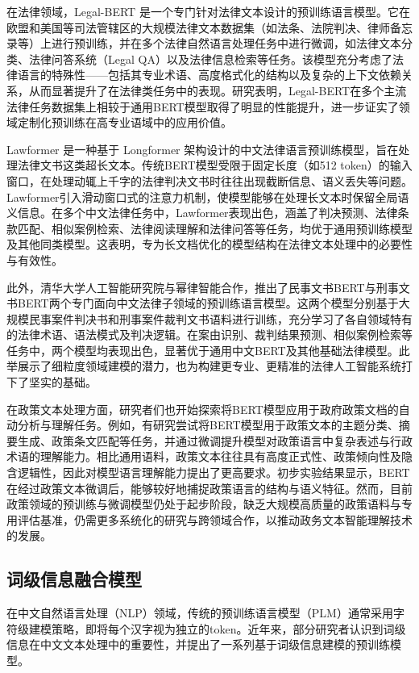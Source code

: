 \documentclass[12pt, a4paper]{ctexart}
\begin{document}
在法律领域，Legal-BERT 是一个专门针对法律文本设计的预训练语言模型\cite{chalkidis2020legalbertmuppetsstraightlaw}。它在欧盟和美国等司法管辖区的大规模法律文本数据集（如法条、法院判决、律师备忘录等）上进行预训练，并在多个法律自然语言处理任务中进行微调，如法律文本分类、法律问答系统（Legal QA）以及法律信息检索等任务。该模型充分考虑了法律语言的特殊性——包括其专业术语、高度格式化的结构以及复杂的上下文依赖关系，从而显著提升了在法律类任务中的表现。研究表明，Legal-BERT在多个主流法律任务数据集上相较于通用BERT模型取得了明显的性能提升，进一步证实了领域定制化预训练在高专业语域中的应用价值。

Lawformer 是一种基于 Longformer 架构设计的中文法律语言预训练模型，旨在处理法律文书这类超长文本\cite{xiao2021lawformerpretrainedlanguagemodel}。传统BERT模型受限于固定长度（如512 token）的输入窗口，在处理动辄上千字的法律判决文书时往往出现截断信息、语义丢失等问题。Lawformer引入滑动窗口式的注意力机制，使模型能够在处理长文本时保留全局语义信息。在多个中文法律任务中，Lawformer表现出色，涵盖了判决预测、法律条款匹配、相似案例检索、法律阅读理解和法律问答等任务，均优于通用预训练模型及其他同类模型。这表明，专为长文档优化的模型结构在法律文本处理中的必要性与有效性。

此外，清华大学人工智能研究院与幂律智能合作，推出了民事文书BERT与刑事文书BERT两个专门面向中文法律子领域的预训练语言模型\cite{zhong2019openclap}。这两个模型分别基于大规模民事案件判决书和刑事案件裁判文书语料进行训练，充分学习了各自领域特有的法律术语、语法模式及判决逻辑。在案由识别、裁判结果预测、相似案例检索等任务中，两个模型均表现出色，显著优于通用中文BERT及其他基础法律模型。此举展示了细粒度领域建模的潜力，也为构建更专业、更精准的法律人工智能系统打下了坚实的基础。

在政策文本处理方面，研究者们也开始探索将BERT模型应用于政府政策文档的自动分析与理解任务。例如，有研究尝试将BERT模型用于政策文本的主题分类、摘要生成、政策条文匹配等任务，并通过微调提升模型对政策语言中复杂表述与行政术语的理解能力\cite{9849586}。相比通用语料，政策文本往往具有高度正式性、政策倾向性及隐含逻辑性，因此对模型语言理解能力提出了更高要求。初步实验结果显示，BERT在经过政策文本微调后，能够较好地捕捉政策语言的结构与语义特征。然而，目前政策领域的预训练与微调模型仍处于起步阶段，缺乏大规模高质量的政策语料与专用评估基准，仍需更多系统化的研究与跨领域合作，以推动政务文本智能理解技术的发展。

\subsection{词级信息融合模型}

在中文自然语言处理（NLP）领域，传统的预训练语言模型（PLM）通常采用字符级建模策略，即将每个汉字视为独立的token。近年来，部分研究者认识到词级信息在中文文本处理中的重要性，并提出了一系列基于词级信息建模的预训练模型。
\end{document}
